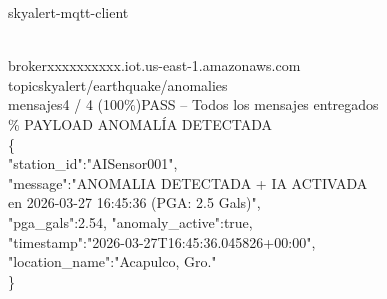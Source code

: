 \documentclass{skyalert-report}
\begin{document}
\newpage



\begin{tcolorbox}[
  enhanced,colback=mqttbg,colframe=mqttframe,boxrule=0.5pt,
  arc=4pt,left=8pt,right=8pt,top=6pt,bottom=6pt,
  shadow={0.5mm}{-0.5mm}{0mm}{black!20}
]
{\ttfamily\small\textcolor{mqttgreen}{\enspace skyalert-mqtt-client}}%
\hfill
{}\\[3mm]
{\ttfamily\footnotesize
\textcolor{mqttcyan}{broker}\hspace{10mm}\textcolor{mqttdim}{xxxxxxxxxx.iot.us-east-1.amazonaws.com}\\
\textcolor{mqttcyan}{topic}\hspace{11.5mm}\textcolor{mqttdim}{skyalert/earthquake/anomalies}\\
\textcolor{mqttcyan}{mensajes}\hspace{6mm}\textcolor{mqttdim}{4 / 4 (100\%)}\hspace{3mm}\textcolor{mqttgreen}{\enspace PASS -- Todos los mensajes entregados}\\[3mm]
\textcolor{mqttframe}{\% PAYLOAD ANOMAL\'IA DETECTADA}\\
\textcolor{mqttdim}{\{}\\
\hspace{4mm}\textcolor{mqttcyan}{"station\_id":}\hspace{2mm}\textcolor{mqttcyan!70!white}{"AISensor001"},\\
\hspace{4mm}\textcolor{mqttcyan}{"message":}\hspace{4mm}\textcolor{mqttcyan!70!white}{"ANOMALIA DETECTADA + IA ACTIVADA}\\
\hspace{4mm}\textcolor{mqttcyan!70!white}{en 2026-03-27 16:45:36 (PGA: 2.5 Gals)"},\\
\hspace{4mm}\textcolor{mqttcyan}{"pga\_gals":}\hspace{3mm}\textcolor{accent}{2.54,}%
\hspace{3mm}\textcolor{mqttcyan}{"anomaly\_active":}\hspace{1mm}\textcolor{amberdark}{true},\\
\hspace{4mm}\textcolor{mqttcyan}{"timestamp":}\hspace{2mm}\textcolor{mqttcyan!70!white}{"2026-03-27T16:45:36.045826+00:00"},\\
\hspace{4mm}\textcolor{mqttcyan}{"location\_name":}\textcolor{mqttcyan!70!white}{"Acapulco, Gro."}\\
\textcolor{mqttdim}{\}}
}
\end{tcolorbox}
\end{document}
